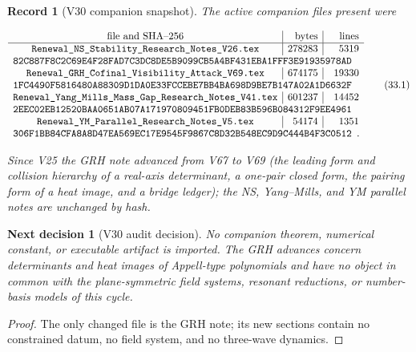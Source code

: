 \documentclass[11pt]{article}
\newtheorem{decision}[theorem]{Next decision}
\newtheorem{record}[theorem]{Record}
\theoremstyle{remark}
\begin{document}
\begin{record}[V30 companion snapshot]
\label{rec:v20v30-snapshot}
The active companion files present were

\[
\begin{array}{c|r|r}
\hbox{file and SHA--256}&\hbox{bytes}&\hbox{lines}\\ \hline
\texttt{Renewal\_NS\_Stability\_Research\_Notes\_V26.tex}
&278283&5319\\
\multicolumn{3}{l}{
\texttt{82C887F8C2C69E4F28FAD7C3DC8DE5B9099CB5A4BF431EBA1FFF3E91935978AD}}
\\
\texttt{Renewal\_GRH\_Cofinal\_Visibility\_Attack\_V69.tex}
&674175&19330\\
\multicolumn{3}{l}{
\texttt{1FC4490F5816480A88309D1DA0E33FCCEBE7BB4BA698D9BE7B147A02A1D6632F}}
\\
\texttt{Renewal\_Yang\_Mills\_Mass\_Gap\_Research\_Notes\_V41.tex}
&601237&14452\\
\multicolumn{3}{l}{
\texttt{2EEC02EB12520BAA0651AB07A171970809451FB0DEB83B596B084312F9EE4961}}
\\
\texttt{Renewal\_YM\_Parallel\_Research\_Notes\_V5.tex}
&54174&1351\\
\multicolumn{3}{l}{
\texttt{306F1BB84CFA8A8D47EA569EC17E9545F9867C8D32B548EC9D9C444B4F3C0512}}.
\end{array}                                                     \tag{33.1}
\]

Since V25 the GRH note advanced from V67 to V69 (the leading form
and collision hierarchy of a real-axis determinant, a one-pair closed
form, the pairing form of a heat image, and a bridge ledger); the NS,
Yang--Mills, and YM parallel notes are unchanged by hash.
\end{record}

\begin{decision}[V30 audit decision]
\label{dec:v20v30-audit}
No companion theorem, numerical constant, or executable artifact is
imported.  The GRH advances concern determinants and heat images of
Appell-type polynomials and have no object in common with the
plane-symmetric field systems, resonant reductions, or number-basis
models of this cycle.
\end{decision}

\begin{proof}
The only changed file is the GRH note; its new sections contain no
constrained datum, no field system, and no three-wave dynamics.
\end{proof}
\end{document}
